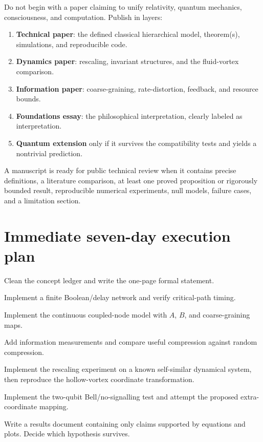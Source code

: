 \documentclass[11pt]{article}
\theoremstyle{definition}
\theoremstyle{plain}
\theoremstyle{remark}
\begin{document}
Do not begin with a paper claiming to unify relativity, quantum mechanics, consciousness, and computation. Publish in layers:
\begin{enumerate}
  \item \textbf{Technical paper}: the defined classical hierarchical model, theorem(s), simulations, and reproducible code.
  \item \textbf{Dynamics paper}: rescaling, invariant structures, and the fluid-vortex comparison.
  \item \textbf{Information paper}: coarse-graining, rate-distortion, feedback, and resource bounds.
  \item \textbf{Foundations essay}: the philosophical interpretation, clearly labeled as interpretation.
  \item \textbf{Quantum extension} only if it survives the compatibility tests and yields a nontrivial prediction.
\end{enumerate}

A manuscript is ready for public technical review when it contains precise definitions, a literature comparison, at least one proved proposition or rigorously bounded result, reproducible numerical experiments, null models, failure cases, and a limitation section.

\section{Immediate seven-day execution plan}

\begin{description}[style=nextline,leftmargin=0pt,labelindent=0pt,labelwidth=0pt,labelsep=0pt]
  \item[Day 1:] Clean the concept ledger and write the one-page formal statement.
  \item[Day 2:] Implement a finite Boolean/delay network and verify critical-path timing.
  \item[Day 3:] Implement the continuous coupled-node model with $A$, $B$, and coarse-graining maps.
  \item[Day 4:] Add information measurements and compare useful compression against random compression.
  \item[Day 5:] Implement the rescaling experiment on a known self-similar dynamical system, then reproduce the hollow-vortex coordinate transformation.
  \item[Day 6:] Implement the two-qubit Bell/no-signalling test and attempt the proposed extra-coordinate mapping.
  \item[Day 7:] Write a results document containing only claims supported by equations and plots. Decide which hypothesis survives.
\end{description}
\end{document}
